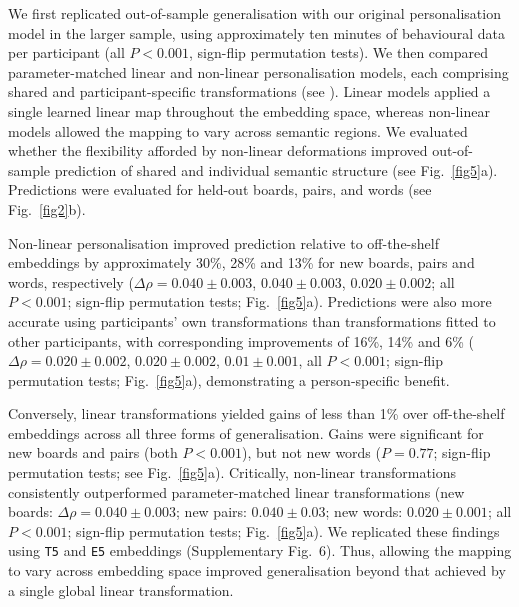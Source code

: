 \documentclass[pdflatex,sn-mathphys]{sn-jnl}
\begin{document}
We first replicated out-of-sample generalisation with our original personalisation model in the larger sample, using approximately ten minutes of behavioural data per participant (all $P < 0.001$, sign-flip permutation tests).  We then compared parameter-matched linear and non-linear personalisation models, each comprising shared and participant-specific transformations (see ). Linear models applied a single learned linear map throughout the embedding space, whereas non-linear models allowed the mapping to vary across semantic regions. We evaluated whether the flexibility afforded by non-linear deformations improved out-of-sample prediction of shared and individual semantic structure (see Fig.~\ref{fig5}a). Predictions were evaluated for held-out boards, pairs, and words (see Fig.~\ref{fig2}b).

Non-linear personalisation improved prediction relative to off-the-shelf embeddings by approximately 30\%, 28\% and 13\% for new boards, pairs and words, respectively ($\Delta\rho = 0.040\pm0.003$, $0.040\pm0.003$, $0.020\pm0.002$; all $P < 0.001$; sign-flip permutation tests; Fig.~\ref{fig5}a). Predictions were also more accurate using participants' own transformations than transformations fitted to other participants, with corresponding improvements of 16\%, 14\% and 6\% ($\Delta\rho = 0.020\pm0.002$, $0.020\pm0.002$, $0.01\pm0.001$, all $P < 0.001$; sign-flip permutation tests; Fig.~\ref{fig5}a), demonstrating a person-specific benefit.

Conversely, linear transformations yielded gains of less than 1\% over off-the-shelf embeddings across all three forms of generalisation. Gains were significant for new boards and pairs (both $P < 0.001$), but not new words ($P = 0.77$; sign-flip permutation tests; see Fig.~\ref{fig5}a). Critically, non-linear transformations consistently outperformed parameter-matched linear transformations (new boards: $\Delta\rho = 0.040\pm0.003$; new pairs: $0.040\pm0.03$; new words: $0.020\pm0.001$; all $P < 0.001$; sign-flip permutation tests; Fig.~\ref{fig5}a). We replicated these findings using \texttt{T5} and \texttt{E5} embeddings (Supplementary Fig.~6). Thus, allowing the mapping to vary across embedding space improved generalisation beyond that achieved by a single global linear transformation.
\end{document}
